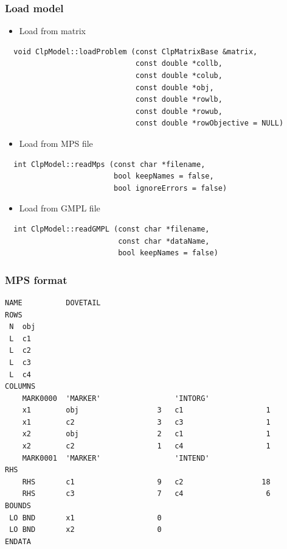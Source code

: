 \documentclass{beamer}
\begin{document}
\begin{frame}[fragile]
  \frametitle{Load model}
  \begin{itemize}
    \item Load from matrix
  \end{itemize}
  \begin{verbatim}
  void ClpModel::loadProblem (const ClpMatrixBase &matrix, 
                              const double *collb, 
                              const double *colub, 
                              const double *obj, 
                              const double *rowlb, 
                              const double *rowub, 
                              const double *rowObjective = NULL)
  \end{verbatim}
  \begin{itemize}
    \item{\footnotesize} Load from MPS file
  \end{itemize}
  \begin{verbatim}
  int ClpModel::readMps (const char *filename, 
                         bool keepNames = false, 
                         bool ignoreErrors = false)   
  \end{verbatim}
  \begin{itemize}
    \item Load from GMPL file
  \end{itemize}
  \begin{verbatim}
  int ClpModel::readGMPL (const char *filename, 
                          const char *dataName, 
                          bool keepNames = false)     
  \end{verbatim}
\end{frame}

\begin{frame}[fragile]
  \frametitle{MPS format}
  \begin{lstlisting}[basicstyle=\tiny]
  NAME          DOVETAIL  
ROWS
 N  obj
 L  c1    
 L  c2
 L  c3
 L  c4
COLUMNS
    MARK0000  'MARKER'                 'INTORG'
    x1        obj                  3   c1                   1
    x1        c2                   3   c3                   1
    x2        obj                  2   c1                   1
    x2        c2                   1   c4                   1
    MARK0001  'MARKER'                 'INTEND'
RHS
    RHS       c1                   9   c2                  18
    RHS       c3                   7   c4                   6
BOUNDS
 LO BND       x1                   0
 LO BND       x2                   0
ENDATA
 \end{lstlisting}
\end{frame}
\end{document}
